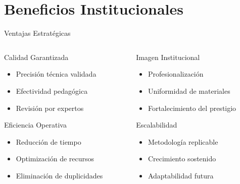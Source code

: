 \documentclass[10pt,aspectratio=169]{beamer}
\begin{document}
	\section{Beneficios Institucionales}
	
	\begin{frame}{Ventajas Estratégicas}
		\begin{columns}
			\begin{column}{0.5\textwidth}
				\begin{alertblock}{Calidad Garantizada}
					\begin{itemize}
						\item Precisión técnica validada
						\item Efectividad pedagógica
						\item Revisión por expertos
					\end{itemize}
				\end{alertblock}
				
				\begin{alertblock}{Eficiencia Operativa}
					\begin{itemize}
						\item Reducción de tiempo
						\item Optimización de recursos
						\item Eliminación de duplicidades
					\end{itemize}
				\end{alertblock}
			\end{column}
			
			\begin{column}{0.5\textwidth}
				\begin{alertblock}{Imagen Institucional}
					\begin{itemize}
						\item Profesionalización
						\item Uniformidad de materiales
						\item Fortalecimiento del prestigio
					\end{itemize}
				\end{alertblock}
				
				\begin{alertblock}{Escalabilidad}
					\begin{itemize}
						\item Metodología replicable
						\item Crecimiento sostenido
						\item Adaptabilidad futura
					\end{itemize}
				\end{alertblock}
			\end{column}
		\end{columns}
	\end{frame}
	
\end{document}

